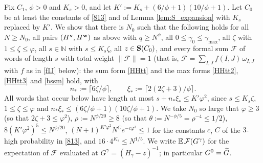 Fix $C_1$, $\phi>0$ and $K_s>0$, and let $K':=K_s+(6/\phi+1)(10/\phi+1)$. Let $C_0$ be at least the constants of \eqref{813} and of Lemma \ref{lem:S_expansion} with $K_s$ replaced by $K'$. We show that there is $N_0$ such that the following holds for all $N\ge N_0$, all pairs $(H^{\mathbf{v}},H^{\mathbf{w}})$ as above with $q\ge N^{\phi}$, all $0\le\gamma_0\le\gamma_{\max}$, all $\zeta$ with $1\le\zeta\le\varphi$, all $s\in\mathbb N$ with $s\le K_s\zeta$, all $z\in{\bf S}(C_0)$, and every formal sum $\mathcal F$ of words of length $s$ with total weight $\|\mathcal F\|=1$ (that is, $\mathcal F=\sum_{I,J}f(I,J)\,\omega_{I,J}$ with $f$ as in \eqref{fIJ} below): the sum form \eqref{HHtt} and the max forms \eqref{HHtt2}, \eqref{HHtt3} and \eqref{bssm} hold, with
$$
n_*:=\lceil6\zeta/\phi\rceil,\qquad\xi_*:=\lceil2(2\zeta+3)/\phi\rceil .
$$
All words that occur below have length at most $s+n_*\xi_*\le K'\varphi^2$, since $s\le K_s\zeta$, $1\le\zeta\le\varphi$ and $n_*\xi_*\le(6\zeta/\phi+1)(10\zeta/\phi+1)$. We take $N_0$ so large that $\varphi\ge3$ (so that $2\zeta+3\le\varphi^2$), $\rho:=N^{\phi/20}\ge8$ (so that $\theta:=N^{-\phi/5}=\rho^{-4}\le1/2$), $8(K'\varphi^2)^5\le N^{\phi/20}$, $(N+1)^{K'\varphi^2}N^{C}e^{-c\varphi^3}\le1$ for the constants $c$, $C$ of the $3$-high probability in \eqref{813}, and $16\cdot4^{K_s}\le N^{1/5}$. We write $\mathbb{E}\,\mathcal F(G^{\gamma})$ for the expectation of $\mathcal F$ evaluated at $G^\gamma=(H_\gamma-z)^{-1}$; in particular $G^0=\widetilde G$.

